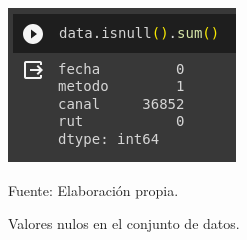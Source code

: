 \begin{figure}[H]
    \begin{minipage}[t]{0.8\textwidth}
        \caption{Valores nulos en el conjunto de datos.}
        \label{valoresNulos}        
    \end{minipage}

    \vspace{10pt}

    \centering
    \begin{minipage}[b]{0.4\textwidth}
        \centering
        \includegraphics[width=\textwidth]{img/valores-nulos.png}        
    \end{minipage}

    \begin{minipage}[t]{0.9\textwidth}
        Fuente: Elaboración propia.
    \end{minipage}
\end{figure}

